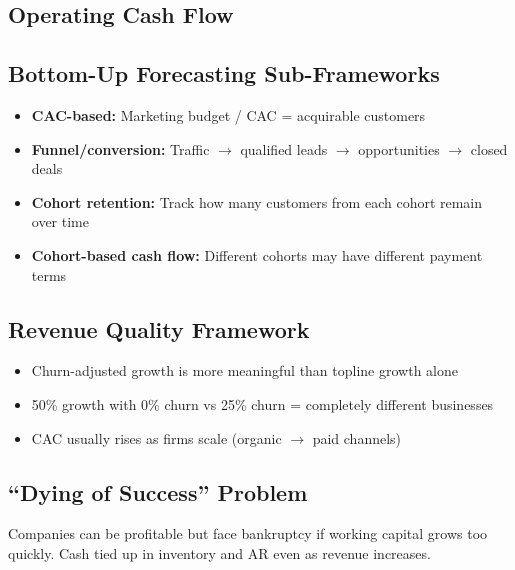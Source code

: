 \documentclass[a4paper,11pt]{article}
\begin{document}
\subsection{Operating Cash Flow}

\begin{center}
\end{center}

\subsection{Bottom-Up Forecasting Sub-Frameworks}

\begin{itemize}
\item \textbf{CAC-based:} Marketing budget / CAC = acquirable customers
\item \textbf{Funnel/conversion:} Traffic $\rightarrow$ qualified leads $\rightarrow$ opportunities $\rightarrow$ closed deals
\item \textbf{Cohort retention:} Track how many customers from each cohort remain over time
\item \textbf{Cohort-based cash flow:} Different cohorts may have different payment terms
\end{itemize}

\subsection{Revenue Quality Framework}

\begin{itemize}
\item Churn-adjusted growth is more meaningful than topline growth alone
\item 50\% growth with 0\% churn vs 25\% churn = completely different businesses
\item CAC usually rises as firms scale (organic $\rightarrow$ paid channels)
\end{itemize}

\subsection{``Dying of Success'' Problem}

Companies can be profitable but face bankruptcy if working capital grows too quickly. Cash tied up in inventory and AR even as revenue increases.
\end{document}
